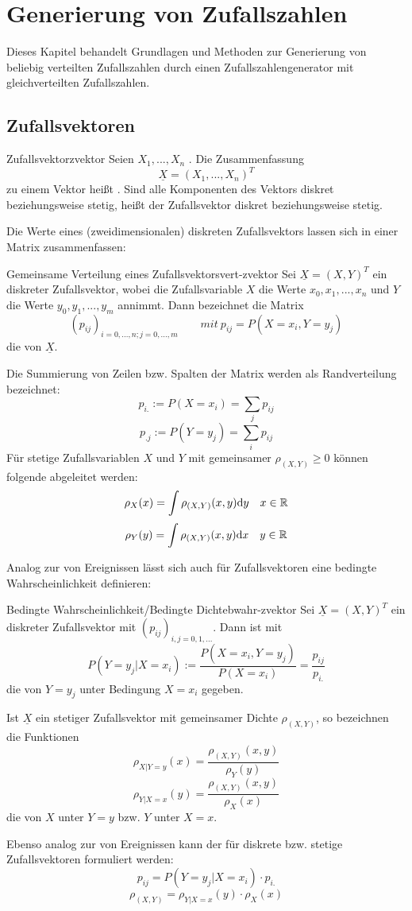 \chapter{Generierung von Zufallszahlen}

Dieses Kapitel behandelt Grundlagen und Methoden zur Generierung von beliebig
verteilten Zufallszahlen durch einen Zufallszahlengenerator mit gleichverteilten
Zufallszahlen.

\section{Zufallsvektoren}

\begin{definition}{Zufallsvektor}{zvektor}
Seien $X_1, ..., X_n$ . Die Zusammenfassung
\[\underline{X} = (X_1, ..., X_n)^T\]
zu einem Vektor heißt . Sind alle Komponenten des Vektors
diskret beziehungsweise stetig, heißt der Zufallsvektor diskret beziehungsweise
stetig.
\end{definition}

Die Werte eines (zweidimensionalen) diskreten Zufallsvektors lassen sich in einer Matrix
zusammenfassen:

\begin{definition}{Gemeinsame Verteilung eines Zufallsvektors}{vert-zvektor}
Sei $\underline{X} = (X, Y)^T$ ein diskreter Zufallsvektor, wobei die
Zufallsvariable $X$ die Werte $x_0, x_1, ..., x_n$ und $Y$ die Werte $y_0, y_1, ...,
y_m$ annimmt. Dann bezeichnet die Matrix
\[(p_{ij})_{i=0,...,n;j=0,...,m} \qquad mit\ p_{ij} = P(X=x_i, Y=y_j)\]
die  von $\underline{X}$.
\end{definition}

Die Summierung von Zeilen bzw. Spalten der Matrix werden als Randverteilung
bezeichnet:
\[p_{i.}:=P(X=x_i) = \sum_j p_{ij}\]
\[p_{.j}:=P(Y=y_j) = \sum_i p_{ij}\]
Für stetige Zufallsvariablen $X$ und $Y$ mit gemeinsamer 
$\rho_{(X, Y)}\ge 0$ können folgende  abgeleitet werden:
\[\rho_X(x) = \int\rho_{(X,Y)}(x,y)\mathrm{d} y\quad x\in\mathbb{R}\]
\[\rho_Y(y) = \int\rho_{(X,Y)}(x,y)\mathrm{d} x\quad y\in\mathbb{R}\]

Analog zur  von Ereignissen lässt sich
auch für Zufallsvektoren eine bedingte Wahrscheinlichkeit definieren:

\begin{definition}{Bedingte Wahrscheinlichkeit/Bedingte Dichte}{bwahr-zvektor}
Sei $\underline{X} = (X, Y)^T$ ein diskreter Zufallsvektor mit
 $(p_{ij})_{i,j=0,1,...}$. Dann ist
mit
\[P(Y=y_j|X=x_i) := \frac{P(X=x_i, Y=y_j)}{P(X=x_i)} = \frac{p_{ij}}{p_{i.}}\]
die  von $Y=y_j$ unter Bedingung $X=x_i$ gegeben.

Ist $\underline{X}$ ein stetiger Zufallsvektor mit gemeinsamer Dichte
$\rho_{(X,Y)}$, so bezeichnen die Funktionen
\[\rho_{X|Y=y}(x) = \frac{\rho_{(X,Y)}(x,y)}{\rho_Y(y)}\]
\[\rho_{Y|X=x}(y) = \frac{\rho_{(X,Y)}(x,y)}{\rho_X(x)}\]
die  von $X$ unter $Y=y$ bzw. $Y$ unter $X=x$.
\end{definition}

Ebenso analog zur  von Ereignissen kann
der  für diskrete bzw. stetige Zufallsvektoren
formuliert werden:
\[p_{ij} = P(Y=y_j|X=x_i)\cdot p_{i.}\]
\[\rho_{(X,Y)} = \rho_{Y|X=x}(y)\cdot\rho_X(x)\]
